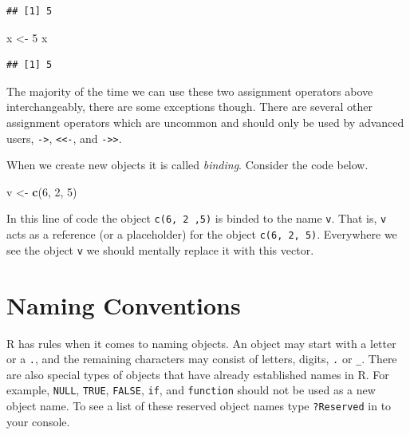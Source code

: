 \documentclass[
]{book}
\newenvironment{Shaded}{\begin{snugshade}}{\end{snugshade}}
\newcommand{\DecValTok}[1]{\textcolor[rgb]{0.00,0.00,0.81}{#1}}
\newcommand{\KeywordTok}[1]{\textcolor[rgb]{0.13,0.29,0.53}{\textbf{#1}}}
\newcommand{\NormalTok}[1]{#1}
\newcommand{\StringTok}[1]{\textcolor[rgb]{0.31,0.60,0.02}{#1}}
\begin{document}
\begin{verbatim}
## [1] 5
\end{verbatim}

\begin{Shaded}
\begin{Highlighting}[]
\NormalTok{x <-}\StringTok{ }\DecValTok{5}
\NormalTok{x}
\end{Highlighting}
\end{Shaded}

\begin{verbatim}
## [1] 5
\end{verbatim}

The majority of the time we can use these two assignment operators above interchangeably, there are some exceptions though. There are several other assignment operators which are uncommon and should only be used by advanced users, \texttt{-\textgreater{}}, \texttt{\textless{}\textless{}-}, and \texttt{-\textgreater{}\textgreater{}}.

When we create new objects it is called \emph{binding}. Consider the code below.

\begin{Shaded}
\begin{Highlighting}[]
\NormalTok{v <-}\StringTok{ }\KeywordTok{c}\NormalTok{(}\DecValTok{6}\NormalTok{, }\DecValTok{2}\NormalTok{, }\DecValTok{5}\NormalTok{)}
\end{Highlighting}
\end{Shaded}

In this line of code the object \texttt{c(6,\ 2\ ,5)} is binded to the name \texttt{v}. That is, \texttt{v} acts as a reference (or a placeholder) for the object \texttt{c(6,\ 2,\ 5)}. Everywhere we see the object \texttt{v} we should mentally replace it with this vector.

\hypertarget{naming-conventions}{%
\section{Naming Conventions}\label{naming-conventions}}

R has rules when it comes to naming objects. An object may start with a letter or a \texttt{.}, and the remaining characters may consist of letters, digits, \texttt{.} or \texttt{\_}. There are also special types of objects that have already established names in R. For example, \texttt{NULL}, \texttt{TRUE}, \texttt{FALSE}, \texttt{if}, and \texttt{function} should not be used as a new object name. To see a list of these reserved object names type \texttt{?Reserved} in to your console.
\end{document}
